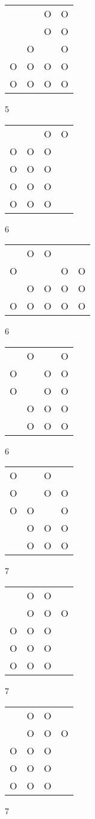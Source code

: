\begin{tabular}{|m{0.2cm}m{0.2cm}m{0.2cm}m{0.2cm}|}\hline
 & &O&O\\
 & &O&O\\
 &O& &O\\
O&O&O&O\\
O&O&O&O\\
\hline\end{tabular}5
\begin{tabular}{|m{0.2cm}m{0.2cm}m{0.2cm}m{0.2cm}|}\hline
 & &O&O\\
O&O&O& \\
O&O&O& \\
O&O&O& \\
O&O&O& \\
\hline\end{tabular}6
\begin{tabular}{|m{0.2cm}m{0.2cm}m{0.2cm}m{0.2cm}m{0.2cm}|}\hline
 &O&O& & \\
O& & &O&O\\
 &O&O&O&O\\
O&O&O&O&O\\
\hline\end{tabular}6
\begin{tabular}{|m{0.2cm}m{0.2cm}m{0.2cm}m{0.2cm}|}\hline
 &O& &O\\
O& &O&O\\
O& &O&O\\
 &O&O&O\\
 &O&O&O\\
\hline\end{tabular}6
\begin{tabular}{|m{0.2cm}m{0.2cm}m{0.2cm}m{0.2cm}|}\hline
O& &O& \\
O& &O&O\\
O&O& &O\\
 &O&O&O\\
 &O&O&O\\
\hline\end{tabular}7
\begin{tabular}{|m{0.2cm}m{0.2cm}m{0.2cm}m{0.2cm}|}\hline
 &O&O& \\
 &O&O&O\\
O&O&O& \\
O&O&O& \\
O&O&O& \\
\hline\end{tabular}7
\begin{tabular}{|m{0.2cm}m{0.2cm}m{0.2cm}m{0.2cm}|}\hline
 &O&O& \\
 &O&O&O\\
O&O&O& \\
O&O&O& \\
O&O&O& \\
\hline\end{tabular}7
